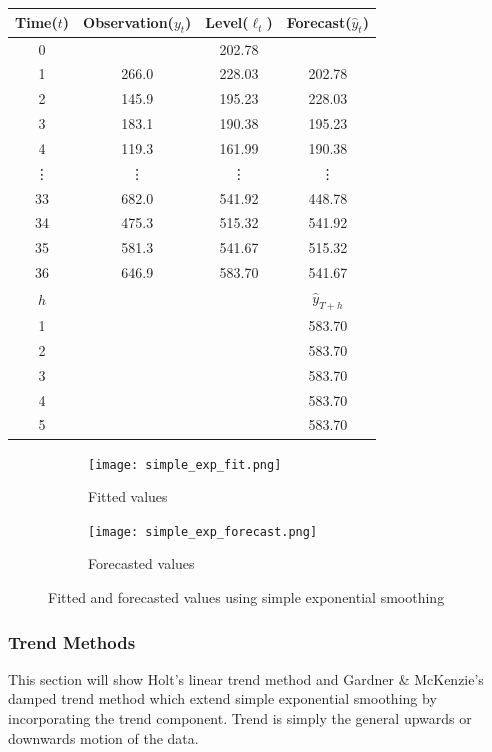 \documentclass{article}
\begin{document}
  \begin{center}
    \begin{tabular}{||c c c c||} 
     \hline
     Time($t$) & Observation($y_t$) & Level($\ell_t$) & Forecast($\hat{y}_t$) \\ [0.5ex] 
     \hline
     0 &       & 202.78 &  \\ 
     \hline
     1 & 266.0 & 228.03 & 202.78 \\
     \hline
     2 & 145.9 & 195.23 & 228.03 \\
     \hline
     3 & 183.1 & 190.38 & 195.23 \\
     \hline
     4 & 119.3 & 161.99 & 190.38 \\
     \hline
     \vdots & \vdots & \vdots & \vdots \\
     \hline
     33 & 682.0 & 541.92 & 448.78 \\
     \hline
     34 & 475.3 & 515.32 & 541.92 \\
     \hline
     35 & 581.3 & 541.67 & 515.32 \\
     \hline
     36 & 646.9 & 583.70 & 541.67 \\
     \hline
     $h$ &  &  & $\hat{y}_{T+h}$ \\
     \hline
     1 &  &  & 583.70 \\
     \hline
     2 &  &  & 583.70 \\
     \hline
     3 &  &  & 583.70 \\
     \hline
     4 &  &  & 583.70 \\
     \hline
     5 &  &  & 583.70 \\
     \hline
    \end{tabular}
  \end{center}

  \begin{figure}[H]
    \centering
    \captionsetup{justification=centering}
    \begin{subfigure}[b]{0.49\linewidth}
      \texttt{[image: simple\_exp\_fit.png]}
      \caption{Fitted values}
    \end{subfigure}
    \begin{subfigure}[b]{0.49\linewidth}
      \texttt{[image: simple\_exp\_forecast.png]}
      \caption{Forecasted values}
    \end{subfigure}
    \caption{Fitted and forecasted values using simple exponential smoothing}
  \end{figure}

  \subsubsection{Trend Methods}
  This section will show Holt's linear trend method and Gardner \& McKenzie's damped trend method which extend simple exponential smoothing by incorporating the trend component. Trend is simply the general upwards or downwards motion of the data.
\end{document}
